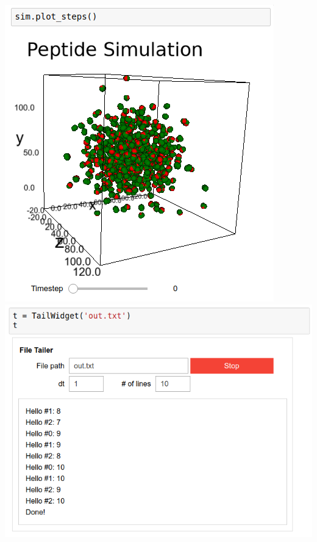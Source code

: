 \documentclass{tikzposter}
\begin{document}
\begin{columns}
 {
\begin{multicols}{2}
    \includegraphics[width=\linewidth]{../img/screenshot/peptide} \\
    \includegraphics[width=.95\linewidth]{../img/screenshot/tail}
\end{multicols}
}




\end{columns}
\end{document}
